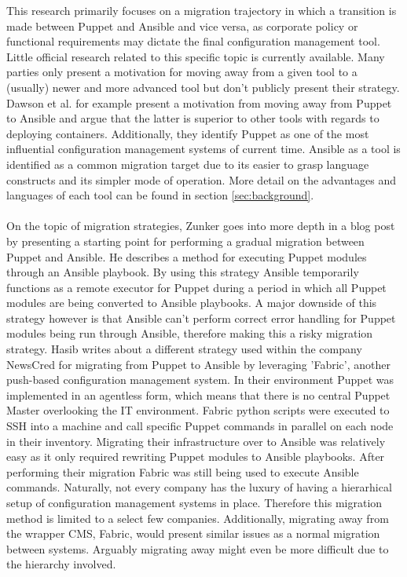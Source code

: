 This research primarily focuses on a migration trajectory in which a transition is made between Puppet and Ansible and vice versa, as corporate policy or functional requirements may dictate the final configuration management tool. Little official research related to this specific topic is currently available. Many parties only present a motivation for moving away from a given tool to a (usually) newer and more advanced tool but don't publicly present their strategy. Dawson et al. \cite{dawson_hall_hecht_2014} for example present a motivation from moving away from Puppet to Ansible and argue that the latter is superior to other tools with regards to deploying containers. Additionally, they identify Puppet as one of the most influential configuration management systems of current time. Ansible as a tool is identified as a common migration target due to its easier to grasp language constructs and its simpler mode of operation. More detail on the advantages and languages of each tool can be found in section \ref{sec:background}. 
\\\\
On the topic of migration strategies, Zunker \cite{zunker_2014} goes into more depth in a blog post by presenting a starting point for performing a gradual migration between Puppet and Ansible. He describes a method for executing Puppet modules through an Ansible playbook. By using this strategy Ansible temporarily functions as a remote executor for Puppet during a period in which all Puppet modules are being converted to Ansible playbooks. A major downside of this strategy however is that Ansible can't perform correct error handling for Puppet modules being run through Ansible, therefore making this a risky migration strategy. Hasib \cite{hasib_2015} writes about a different strategy used within the company NewsCred for migrating from Puppet to Ansible by leveraging 'Fabric', another push-based configuration management system. In their environment Puppet was implemented in an agentless form, which means that there is no central Puppet Master overlooking the IT environment. Fabric python scripts were executed to SSH into a machine and call specific Puppet commands in parallel on each node in their inventory. Migrating their infrastructure over to Ansible was relatively easy as it only required rewriting Puppet modules to Ansible playbooks. After performing their migration Fabric was still being used to execute Ansible commands. Naturally, not every company has the luxury of having a hierarhical setup of configuration management systems in place. Therefore this migration method is limited to a select few companies. Additionally, migrating away from the wrapper CMS, Fabric, would present similar issues as a normal migration between systems. Arguably migrating away might even be more difficult due to the hierarchy involved. 

